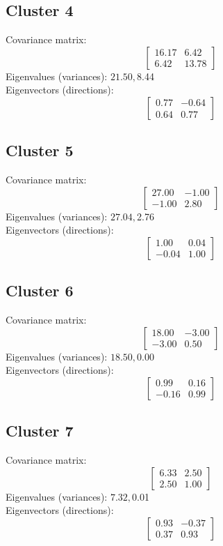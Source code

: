 \documentclass{article}
\begin{document}
\subsection*{Cluster 4}
Covariance matrix:
\[\begin{bmatrix}16.17 & 6.42 \\6.42 & 13.78\end{bmatrix}\]
Eigenvalues (variances): $ 21.50, $8.44\\
Eigenvectors (directions):
\[\begin{bmatrix}0.77 & -0.64 \\0.64 & 0.77\end{bmatrix}\]
\subsection*{Cluster 5}
Covariance matrix:
\[\begin{bmatrix}27.00 & -1.00 \\-1.00 & 2.80\end{bmatrix}\]
Eigenvalues (variances): $ 27.04, $2.76\\
Eigenvectors (directions):
\[\begin{bmatrix}1.00 & 0.04 \\-0.04 & 1.00\end{bmatrix}\]
\subsection*{Cluster 6}
Covariance matrix:
\[\begin{bmatrix}18.00 & -3.00 \\-3.00 & 0.50\end{bmatrix}\]
Eigenvalues (variances): $ 18.50, $0.00\\
Eigenvectors (directions):
\[\begin{bmatrix}0.99 & 0.16 \\-0.16 & 0.99\end{bmatrix}\]
\subsection*{Cluster 7}
Covariance matrix:
\[\begin{bmatrix}6.33 & 2.50 \\2.50 & 1.00\end{bmatrix}\]
Eigenvalues (variances): $ 7.32, $0.01\\
Eigenvectors (directions):
\[\begin{bmatrix}0.93 & -0.37 \\0.37 & 0.93\end{bmatrix}\]
\end{document}
